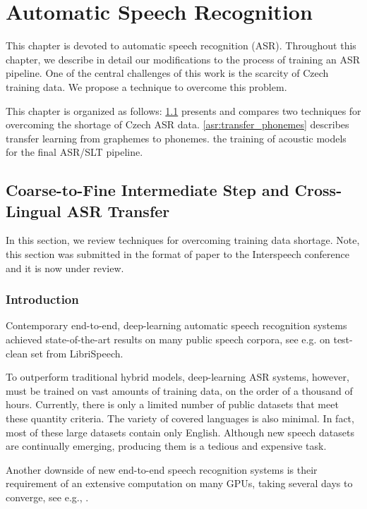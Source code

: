 \chapter{Automatic Speech Recognition}
\label{chapter:asr}

This chapter is devoted to automatic speech recognition (ASR). Throughout this chapter, we describe in detail our modifications to the process of training an ASR pipeline. One of the central challenges of this work is the scarcity of Czech training data. We propose a technique to overcome this problem. 

This chapter is organized as follows: \cref{asr:crosslingual_intermediate} presents and compares two techniques for overcoming the shortage of Czech ASR data. \cref{asr:transfer_phonemes} describes transfer learning from graphemes to phonemes.  the training of acoustic models for the final ASR/SLT pipeline. 


\section{Coarse-to-Fine Intermediate Step and Cross-Lin\-gual ASR Transfer}
\label{asr:crosslingual_intermediate}

In this section, we review techniques for overcoming training data shortage. Note, this section was submitted in the format of paper to the Interspeech conference and it is now under review.

\subsection{Introduction}

Contemporary end-to-end, deep-learning automatic speech recognition systems achie\-ved state-of-the-art results on many public speech corpora, see e.g. 
on test-clean set from LibriSpeech.

To outperform traditional hybrid models, deep-learning ASR systems, however, must be trained on vast amounts of training data, on the order of a thousand of hours. Currently, there is only a limited number of public datasets that meet these quantity criteria. The variety of covered languages is also minimal. In fact, most of these large datasets contain only English. Although new speech datasets are continually emerging, producing them is a tedious and expensive task.

Another downside of new end-to-end speech recognition systems is their requirement of an extensive computation on many GPUs, taking several days to converge, see e.g., . 

